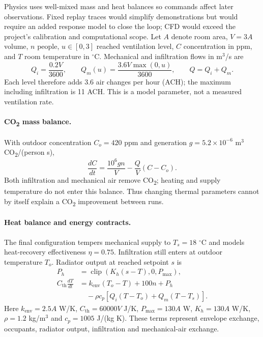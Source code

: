\documentclass[11pt,a4paper]{article}
\begin{document}
Physics uses well-mixed mass and heat balances so commands affect later observations. Fixed replay traces would simplify demonstrations but would require an added response model to close the loop; CFD would exceed the project's calibration and computational scope. Let $A$ denote room area, $V=3A$ volume, $n$ people, $u\in[0,3]$ reached ventilation level, $C$ concentration in ppm, and $T$ room temperature in $^\circ$C. Mechanical and infiltration flows in m$^3$/s are
\begin{equation}
Q_i=\frac{0.2V}{3600},\qquad Q_m(u)=\frac{3.6V\max(0,u)}{3600},\qquad Q=Q_i+Q_m.
\end{equation}
Each level therefore adds 3.6 air changes per hour (ACH); the maximum including infiltration is 11 ACH. This is a model parameter, not a measured ventilation rate.

\paragraph{CO\textsubscript{2} mass balance.}
With outdoor concentration $C_o=420$ ppm and generation $g=5.2\times10^{-6}$ m$^3$ CO\textsubscript{2}/(person s),
\begin{equation}
\frac{dC}{dt}=\frac{10^6gn}{V}-\frac{Q}{V}(C-C_o).
\end{equation}
Both infiltration and mechanical air remove CO\textsubscript{2}; heating and supply temperature do not enter this balance. Thus changing thermal parameters cannot by itself explain a CO\textsubscript{2} improvement between runs.

\paragraph{Heat balance and energy contracts.}
The final configuration tempers mechanical supply to $T_s=18$ $^\circ$C and models heat-recovery effectiveness $\eta=0.75$. Infiltration still enters at outdoor temperature $T_o$. Radiator output at reached setpoint $s$ is
\begin{align}
P_h&=\operatorname{clip}(K_h(s-T),0,P_{\max}),\\
C_{\mathrm{th}}\frac{dT}{dt}
 &= k_{\mathrm{env}}(T_o-T)+100n+P_h\nonumber\\
 &\quad-\rho c_p\left[Q_i(T-T_o)+Q_m(T-T_s)\right].
\end{align}
Here $k_{\mathrm{env}}=2.5A$ W/K, $C_{\mathrm{th}}=60000V$ J/K, $P_{\max}=130A$ W, $K_h=130A$ W/K, $\rho=1.2$ kg/m$^3$ and $c_p=1005$ J/(kg K). These terms represent envelope exchange, occupants, radiator output, infiltration and mechanical-air exchange.
\end{document}
